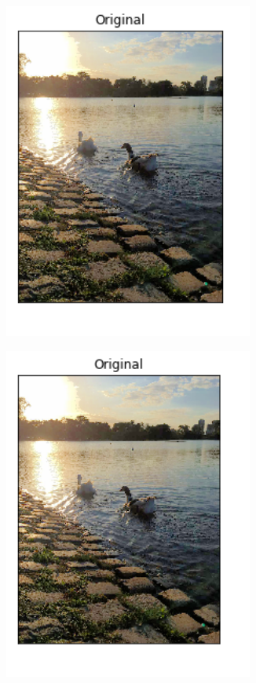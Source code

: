 \documentclass[10pt, a4paper]{article}
\begin{document}
\begin{figure}[H]
\begin{subfigure}{0.3\textwidth}
        \includegraphics[width=0.9\textwidth]{patitos-alphabetafijos-k8.png}
    \end{subfigure}\hfill	
    \centering
    \begin{subfigure}{0.3\textwidth}
        \includegraphics[width=0.9\textwidth]{patitos-alphabetafijos-k16.png}

\end{subfigure}
\end{figure}
\end{document}
